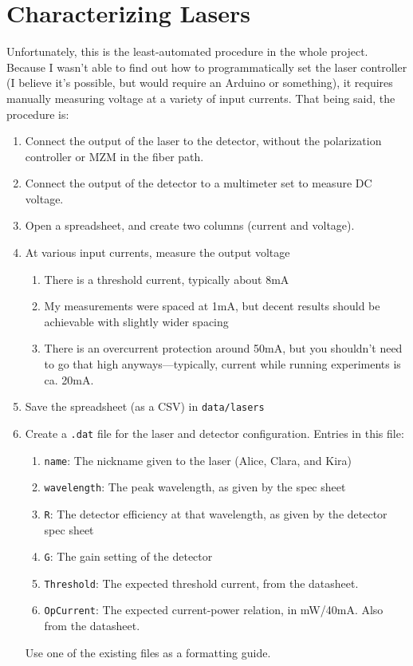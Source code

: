 \documentclass{article}
\newcommand{\code}{\lstinline}
\begin{document}
    \section{Characterizing Lasers}
    Unfortunately, this is the least-automated procedure in the whole project. Because I wasn't able to find out how to programmatically set the laser controller (I believe it's possible, but would require an Arduino or something), it requires manually measuring voltage at a variety of input currents. That being said, the procedure is:
    \begin{enumerate}
        \item Connect the output of the laser to the detector, without the polarization controller or MZM in the fiber path.
        \item Connect the output of the detector to a multimeter set to measure DC voltage.
        \item Open a spreadsheet, and create two columns (current and voltage).
        \item At various input currents, measure the output voltage
        \begin{enumerate}
            \item There is a threshold current, typically about 8mA
            \item My measurements were spaced at 1mA, but decent results should be achievable with slightly wider spacing
            \item There is an overcurrent protection around 50mA, but you shouldn't need to go that high anyways---typically, current while running experiments is ca. 20mA.
        \end{enumerate}
        \item Save the spreadsheet (as a CSV) in \code{data/lasers}
        \item Create a \code{.dat} file for the laser and detector configuration. Entries in this file:
        \begin{enumerate}
            \item \code{name}: The nickname given to the laser (Alice, Clara, and Kira)
            \item \code{wavelength}: The peak wavelength, as given by the spec sheet
            \item \code{R}: The detector efficiency at that wavelength, as given by the detector spec sheet
            \item \code{G}: The gain setting of the detector
            \item \code{Threshold}: The expected threshold current, from the datasheet.
            \item \code{OpCurrent}: The expected current-power relation, in mW/40mA. Also from the datasheet.
        \end{enumerate}
        Use one of the existing files as a formatting guide.
    \end{enumerate}
\end{document}
